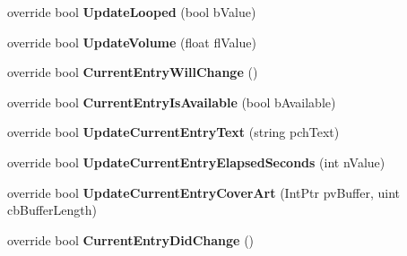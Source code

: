 \begin{DoxyCompactItemize}
\mbox{\label{class_valve_1_1_steamworks_1_1_c_steam_music_remote_a750ec6898d2216ca68099e92769a55a3}} 
override bool {\bfseries Update\+Looped} (bool b\+Value)
\item 
\mbox{\label{class_valve_1_1_steamworks_1_1_c_steam_music_remote_ab31409ec19e94cf5d4a9e891e5bab2fb}} 
override bool {\bfseries Update\+Volume} (float fl\+Value)
\item 
\mbox{\label{class_valve_1_1_steamworks_1_1_c_steam_music_remote_a60cc5c5c6dfeb07be566e1a7b9c59327}} 
override bool {\bfseries Current\+Entry\+Will\+Change} ()
\item 
\mbox{\label{class_valve_1_1_steamworks_1_1_c_steam_music_remote_a0a54ed1e7909445c51428a8f1238406a}} 
override bool {\bfseries Current\+Entry\+Is\+Available} (bool b\+Available)
\item 
\mbox{\label{class_valve_1_1_steamworks_1_1_c_steam_music_remote_aa756ae64054c4708c4253d3f19252bbd}} 
override bool {\bfseries Update\+Current\+Entry\+Text} (string pch\+Text)
\item 
\mbox{\label{class_valve_1_1_steamworks_1_1_c_steam_music_remote_afc0e3cd39600d84d4df3d24daf9254fb}} 
override bool {\bfseries Update\+Current\+Entry\+Elapsed\+Seconds} (int n\+Value)
\item 
\mbox{\label{class_valve_1_1_steamworks_1_1_c_steam_music_remote_a3639fdb403de0417525ef0ca655d46f9}} 
override bool {\bfseries Update\+Current\+Entry\+Cover\+Art} (Int\+Ptr pv\+Buffer, uint cb\+Buffer\+Length)
\item 
\mbox{\label{class_valve_1_1_steamworks_1_1_c_steam_music_remote_a510a383336e178057a582767815aaa07}} 
override bool {\bfseries Current\+Entry\+Did\+Change} ()
\item 
\mbox{\label{class_valve_1_1_steamworks_1_1_c_steam_music_remote_a6bdf4094c48d045686558b76df47d6bf}} 

\end{DoxyCompactItemize}
